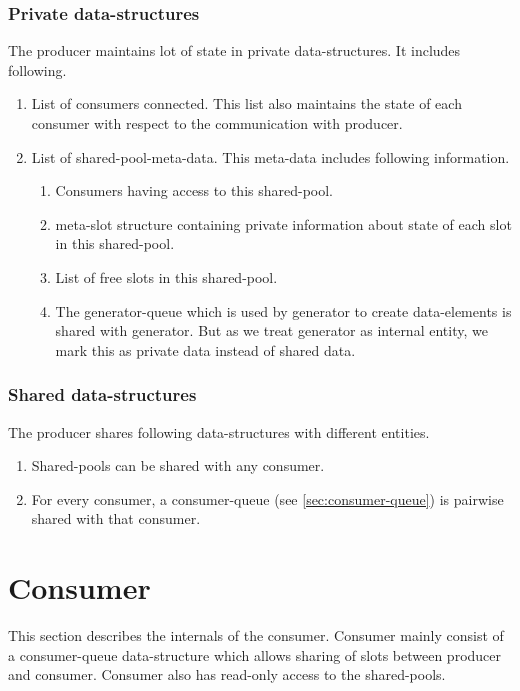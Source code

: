 \documentclass[a4paper,twoside]{report} %
\begin{document}
\subsubsection{Private data-structures}
The producer maintains lot of state in private data-structures.  It
includes following.
\begin{enumerate}
  \item List of consumers connected. This list also maintains the
  state of each consumer with respect to the communication with
  producer.
  \item List of shared-pool-meta-data. This meta-data includes
  following information.
    \begin{enumerate}
      \item Consumers having access to this shared-pool.
      \item meta-slot structure containing private information about
      state of each slot in this shared-pool.
      \item List of free slots in this shared-pool.
  \item The generator-queue which is used by generator to create
  data-elements is shared with generator. But as we treat generator as
  internal entity, we mark this as private data instead of shared
  data.
    \end{enumerate}
\end{enumerate}

\subsubsection{Shared data-structures}
The producer shares following data-structures with different entities.
\begin{enumerate}
  \item Shared-pools can be shared with any consumer. 
  \item For every consumer, a consumer-queue (see 
  \ref{sec:consumer-queue}) is pairwise shared with that consumer.
\end{enumerate}

\section{Consumer}
This section describes the internals of the consumer.  Consumer mainly
consist of a consumer-queue data-structure which allows sharing of
slots between producer and consumer.  Consumer also has read-only 
access to the shared-pools.
\end{document}
